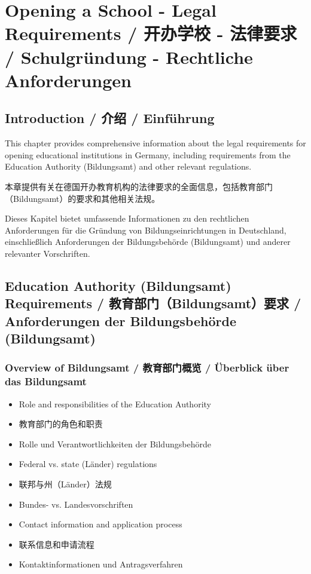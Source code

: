 \chapter{Opening a School - Legal Requirements / 开办学校 - 法律要求 / Schulgründung - Rechtliche Anforderungen}

\section{Introduction / 介绍 / Einführung}

This chapter provides comprehensive information about the legal requirements for opening educational institutions in Germany, including requirements from the Education Authority (Bildungsamt) and other relevant regulations.

本章提供有关在德国开办教育机构的法律要求的全面信息，包括教育部门（Bildungsamt）的要求和其他相关法规。

Dieses Kapitel bietet umfassende Informationen zu den rechtlichen Anforderungen für die Gründung von Bildungseinrichtungen in Deutschland, einschließlich Anforderungen der Bildungsbehörde (Bildungsamt) und anderer relevanter Vorschriften.

\section{Education Authority (Bildungsamt) Requirements / 教育部门（Bildungsamt）要求 / Anforderungen der Bildungsbehörde (Bildungsamt)}

\subsection{Overview of Bildungsamt / 教育部门概览 / Überblick über das Bildungsamt}
\begin{itemize}
    \item Role and responsibilities of the Education Authority
    \item 教育部门的角色和职责
    \item Rolle und Verantwortlichkeiten der Bildungsbehörde
    \item Federal vs. state (Länder) regulations
    \item 联邦与州（Länder）法规
    \item Bundes- vs. Landesvorschriften
    \item Contact information and application process
    \item 联系信息和申请流程
    \item Kontaktinformationen und Antragsverfahren
\end{itemize}

